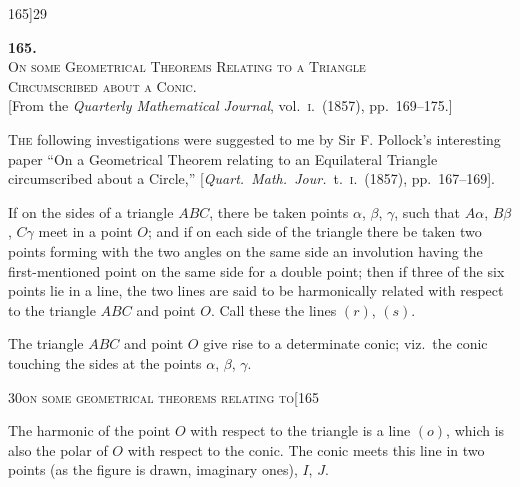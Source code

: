 \documentclass[11pt]{article}
\begin{document}
\begin{center}
\small 165]\hfill\textsc{29}
\end{center}

\bigskip

\begin{center}
{\large\textbf{165.}}\\[1em]
{\large\scshape On some Geometrical Theorems Relating to a Triangle\\ Circumscribed about a Conic.}\\[1em]
{\small [From the \textit{Quarterly Mathematical Journal}, vol.~\textsc{i}.\ (1857), pp.~169--175.]}
\end{center}

\bigskip

\textsc{The} following investigations were suggested to me by Sir F. Pollock's interesting
paper ``On a Geometrical Theorem relating to an Equilateral Triangle circumscribed
about a Circle,'' [\textit{Quart.\ Math.\ Jour.}\ t.~\textsc{i}.\ (1857), pp.~167--169].

If on the sides of a triangle $ABC$, there be taken points $\alpha$, $\beta$, $\gamma$, such that
$A\alpha$, $B\beta$, $C\gamma$ meet in a point $O$; and if on each side of the triangle there be taken
two points forming with the two angles on the same side an involution having the
first-mentioned point on the same side for a double point; then if three of the six
points lie in a line, the two lines are said to be harmonically related with respect to
the triangle $ABC$ and point $O$. Call these the lines $(r)$, $(s)$.

The triangle $ABC$ and point $O$ give rise to a determinate conic; viz.\ the conic
touching the sides at the points $\alpha$, $\beta$, $\gamma$.

\newpage

\begin{center}
\small\textsc{30}\hfill\textsc{on some geometrical theorems relating to}\hfill[165
\end{center}

\medskip

\noindent The harmonic of the point $O$ with respect to the triangle is a line $(o)$, which
is also the polar of $O$ with respect to the conic. The conic meets this line in two
points (as the figure is drawn, imaginary ones), $I$, $J$.
\end{document}
